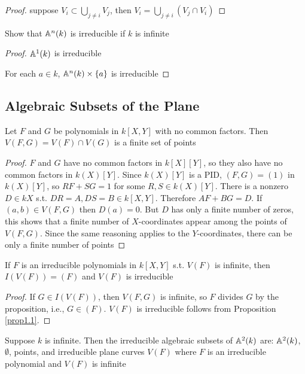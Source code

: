 \documentclass[11pt]{article}
\begin{document}
\begin{proof}
suppose \(V_i\subset\bigcup_{j\neq i}V_j\), then \(V_i=\bigcup_{j\neq i}(V_j\cap V_i)\)
\end{proof}

\begin{exercise}
\label{ex1.29}
Show that \(\mathbb{A}^n(k)\) is irreducible if \(k\) is infinite
\end{exercise}

\begin{proof}
\(\mathbb{A}^1(k)\) is irreducible

For each \(a\in k\), \(\mathbb{A}^n(k)\times\{a\}\) is irreducible
\end{proof}
\subsection{Algebraic Subsets of the Plane}
\label{sec:org047750a}
\begin{proposition}[]
\label{prop1.2}
Let \(F\) and \(G\) be polynomials in \(k[X,Y]\) with no common factors.
Then \(V(F,G)=V(F)\cap V(G)\) is a finite set of points
\end{proposition}

\begin{proof}
\(F\) and \(G\) have no common factors in \(k[X][Y]\), so they also have no common factors
in \(k(X)[Y]\). Since \(k(X)[Y]\) is a PID, \((F,G)=(1)\) in \(k(X)[Y]\), so \(RF+SG=1\) for
some \(R,S\in k(X)[Y]\). There is a nonzero \(D\in k{X}\) s.t. \(DR=A,DS=B\in k[X,Y]\).
Therefore \(AF+BG=D\). If \((a,b)\in V(F,G)\) then \(D(a)=0\). But \(D\) has only a finite number
of zeros, this shows that a finite number of \(X\)-coordinates appear among the points
of \(V(F,G)\). Since the same reasoning applies to the \(Y\)-coordinates, there can be only a
finite number of points
\end{proof}

\begin{corollary}[]
If \(F\) is an irreducible polynomials in \(k[X,Y]\) s.t. \(V(F)\) is infinite,
then \(I(V(F))=(F)\) and \(V(F)\) is irreducible
\end{corollary}

\begin{proof}
If \(G\in I(V(F))\), then \(V(F,G)\) is infinite, so \(F\) divides \(G\) by the proposition,
i.e., \(G\in(F)\). \(V(F)\) is irreducible follows from Proposition \ref{prop1.1}.
\end{proof}

\begin{corollary}[]
Suppose \(k\) is infinite. Then the irreducible algebraic subsets of \(\mathbb{A}^2(k)\)
are: \(\mathbb{A}^2(k)\), \(\emptyset\), points, and irreducible plane curves \(V(F)\) where \(F\) is an
irreducible polynomial and \(V(F)\) is infinite
\end{corollary}
\end{document}
